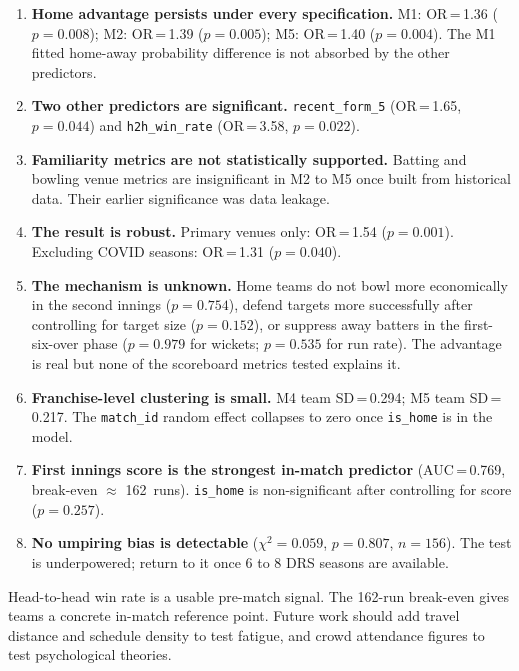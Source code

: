 \documentclass[12pt,a4paper]{article}
\begin{document}
\begin{enumerate}
  \item \textbf{Home advantage persists under every specification.} M1: OR\,=\,1.36
    ($p = 0.008$); M2: OR\,=\,1.39 ($p = 0.005$); M5: OR\,=\,1.40 ($p = 0.004$). The
    M1 fitted home-away probability difference is not absorbed by the other predictors.

  \item \textbf{Two other predictors are significant.} \texttt{recent\_form\_5}
    (OR\,=\,1.65, $p = 0.044$) and \texttt{h2h\_win\_rate} (OR\,=\,3.58, $p = 0.022$).

  \item \textbf{Familiarity metrics are not statistically supported.} Batting and bowling venue metrics are
    insignificant in M2 to M5 once built from historical data. Their earlier significance was
    data leakage.

  \item \textbf{The result is robust.} Primary venues only: OR\,=\,1.54 ($p = 0.001$).
    Excluding COVID seasons: OR\,=\,1.31 ($p = 0.040$).

  \item \textbf{The mechanism is unknown.} Home teams do not bowl more economically in the
    second innings ($p = 0.754$), defend targets more successfully after controlling for
    target size ($p = 0.152$), or suppress away batters in the first-six-over phase ($p = 0.979$ for
    wickets; $p = 0.535$ for run rate). The advantage is real but none of the scoreboard
    metrics tested explains it.

  \item \textbf{Franchise-level clustering is small.} M4 team SD\,=\,0.294; M5 team
    SD\,=\,0.217. The \texttt{match\_id} random effect collapses to zero once
    \texttt{is\_home} is in the model.

  \item \textbf{First innings score is the strongest in-match predictor} (AUC\,=\,0.769,
    break-even $\approx$ 162~runs). \texttt{is\_home} is non-significant after controlling
    for score ($p = 0.257$).

  \item \textbf{No umpiring bias is detectable} ($\chi^2 = 0.059$, $p = 0.807$, $n = 156$).
    The test is underpowered; return to it once 6 to 8 DRS seasons are available.
\end{enumerate}

Head-to-head win rate is a usable pre-match signal. The 162-run break-even gives teams a
concrete in-match reference point. Future work should add travel distance and schedule
density to test fatigue, and crowd attendance figures to test psychological theories.
\end{document}

